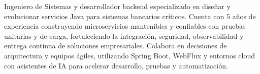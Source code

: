 Ingeniero de Sistemas y desarrollador backend especializado en diseñar y evolucionar servicios Java para sistemas bancarios críticos. Cuenta con 5 años de experiencia construyendo microservicios mantenibles y confiables con pruebas unitarias y de carga, fortaleciendo la integración, seguridad, observabilidad y entrega continua de soluciones empresariales. Colabora en decisiones de arquitectura y equipos ágiles, utilizando Spring Boot, WebFlux y entornos cloud con asistentes de IA para acelerar desarrollo, pruebas y automatización.
